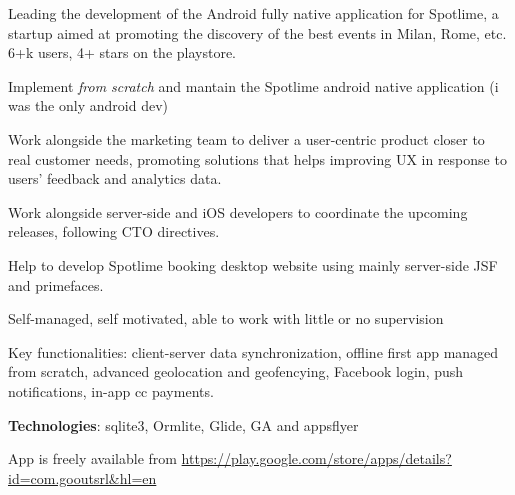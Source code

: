 \begin{cventries}
{\begin{cvitems}
	\item Leading the 
   development of the 
   Android fully native application for 
   Spotlime, a startup aimed  at promoting  the 
   discovery of the best events in Milan, Rome, etc. 6+k users,  4+ stars on the playstore. 
      \item Implement \emph{from scratch} and mantain the Spotlime android
	      native application (i was the only android dev)
      \item 
   Work alongside the marketing team to deliver a user-centric product closer
   to real customer 
   needs, promoting solutions that helps improving UX in response
   to users' feedback and analytics data.
      \item 
   Work alongside server-side and iOS developers to coordinate the upcoming
   releases, following CTO directives.
\item Help to develop Spotlime booking desktop website using mainly server-side JSF and
   primefaces.
      \item Self-managed, self motivated, able to work with little or no supervision
\item Key functionalities: 
	client-server data synchronization, offline first app managed from scratch, 
   advanced geolocation and geofencying, Facebook login, push notifications, in-app cc payments.
\item \textbf{Technologies}: sqlite3, Ormlite, Glide, GA and appsflyer
   \item App is freely available from 
   \url{https://play.google.com/store/apps/details?id=com.gooutsrl&hl=en}
	\end{cvitems}
}


\end{cventries}
